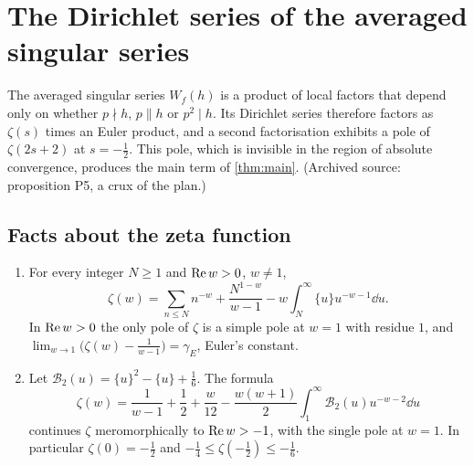 \chapter{The Dirichlet series of the averaged singular series}\label{ch:dirichlet}

The averaged singular series $W_f(h)$ is a product of local factors that depend only on whether $p\nmid h$, $p\parallel h$ or $p^2\mid h$. Its Dirichlet series therefore factors as $\zeta(s)$ times an Euler product, and a second factorisation exhibits a pole of $\zeta(2s+2)$ at $s=-\frac12$. This pole, which is invisible in the region of absolute convergence, produces the main term of \cref{thm:main}. (Archived source: proposition P5, a crux of the plan.)

\section{Facts about the zeta function}

\begin{lemma}\label{lem:zeta}
\begin{enumerate}[label=(\alph*)]
\item For every integer $N\ge1$ and $\operatorname{Re} w>0$, $w\ne1$,
\begin{equation}\label{eq:zeta-N}
\zeta(w)=\sum_{n\le N}n^{-w}+\frac{N^{1-w}}{w-1}-w\int_N^\infty\{u\}u^{-w-1}\dd u.
\end{equation}
In $\operatorname{Re} w>0$ the only pole of $\zeta$ is a simple pole at $w=1$ with residue $1$, and $\lim_{w\to1}\bigl(\zeta(w)-\frac1{w-1}\bigr)=\gamma_E$, Euler's constant.
\item Let $\mathcal B_2(u)=\{u\}^2-\{u\}+\frac16$. The formula
\begin{equation}\label{eq:zeta-B2}
\zeta(w)=\frac1{w-1}+\frac12+\frac w{12}-\frac{w(w+1)}2\int_1^\infty\mathcal B_2(u)u^{-w-2}\dd u
\end{equation}
continues $\zeta$ meromorphically to $\operatorname{Re} w>-1$, with the single pole at $w=1$. In particular $\zeta(0)=-\frac12$ and $-\frac14\le\zeta(-\frac12)\le-\frac16$.
\end{enumerate}
\end{lemma}

